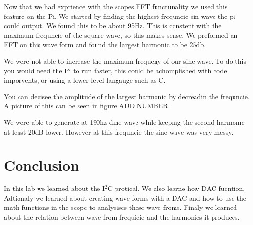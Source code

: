 \documentclass[prl,12pt,notitlepage,aps,onecolumn,superscriptaddress]{revtex4-1}
\begin{document}
Now that we had exprience with the scopes FFT functunality we used this feature on the Pi. We started by finding the highest frequncie sin wave the pi could output. We found this to be about 95Hz. This is constent with the maximum frequncie of the square wave, so this makes sense. We preformed an FFT on this wave form and found the largest harmonic to be 25db.

We were not able to increase the maximum frequeny of our sine wave. To do this you would need the Pi to run faster, this could be achomplished with code imporvents, or using a lower level langauge such as C. 

You can decisee the amplitude of the largest harmonic by decreadin the frequncie. A picture of this can be seen in figure ADD NUMBER.

We were able to generate at 190hz dine wave while keeping the second harmonic at least 20dB lower. However at this frequncie the sine wave was very messy. 

\section{Conclusion}
In this lab we learned about the I$^2$C protical. We also learne how DAC fucntion. Adtionaly we learned about creating wave forms with a DAC and how to use the math functions in the scope to analysises these wave froms. Finaly we learned about the relation between wave from frequicie and the harmonics it produces. 
\end{document}
